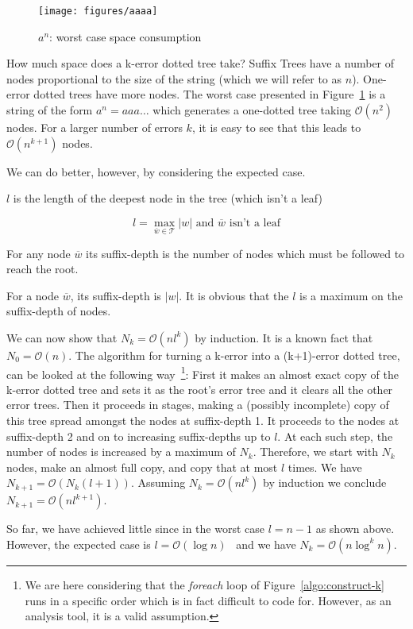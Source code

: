 \begin{figure}
\centering
\texttt{[image: figures/aaaa]}
\caption{$a^n$: worst case space consumption}%
\label{fig:aaaa}
\end{figure}

How much space does a k-error dotted tree take? Suffix Trees have a number of nodes proportional to the size of the string (which we will refer to as $n$). One-error dotted trees have more nodes. The worst case presented in Figure~\ref{fig:aaaa} is a string of the form $a^n = aaa\dots$ which generates a one-dotted tree taking $\mathcal{O}(n^2)$ nodes. For a larger number of errors $k$, it is easy to see that this leads to $\mathcal{O}(n^{k+1})$ nodes.

We can do better, however, by considering the expected case.

\begin{definition}
$l$ is the length of the deepest node in the tree (which isn't a leaf)

\[ l = \max_{\overline{w} \in \mathcal{T}} |w| \mbox{ and $\overline{w}$ isn't a leaf} \]
\end{definition}

\begin{definition}
For any node $\overline{w}$ its suffix-depth is the number of nodes which must be followed to reach the root.
\end{definition}

For a node $\overline{w}$, its suffix-depth is $|w|$. It is obvious that the $l$ is a maximum on the suffix-depth of nodes.

We can now show that $N_k = \mathcal{O}(nl^k)$ by induction. It is a known fact that $N_0 = \mathcal{O}(n)$. The algorithm for turning a k-error into a (k+1)-error dotted tree, can be looked at the following way~\footnote{We are here considering that the \textit{foreach} loop of Figure~\ref{algo:construct-k} runs in a specific order which is in fact difficult to code for. However, as an analysis tool, it is a valid assumption.}: First it makes an almost exact copy of the k-error dotted tree and sets it as the root's error tree and it clears all the other error trees. Then it proceeds in stages, making a (possibly incomplete) copy of this tree spread amongst the nodes at suffix-depth 1. It proceeds to the nodes at suffix-depth 2 and on to increasing suffix-depths up to $l$. At each such step, the number of nodes is increased by a maximum of $N_k$. Therefore, we start with $N_k$ nodes, make an almost full copy, and copy that at most $l$ times. We have $N_{k+1}=\mathcal{O}(N_k(l+1))$. Assuming $N_k=\mathcal{O}(nl^k)$ by induction we conclude $N_{k+1}=\mathcal{O}(nl^{k+1})$.

So far, we have achieved little since in the worst case $l=n-1$ as shown above. However, the expected case is $l=\mathcal{O}(\log n)$~\cite{apostolico92selfalignments,szpankowski:unexpected} and we have $N_k=\mathcal{O}(n\log^k n)$.
